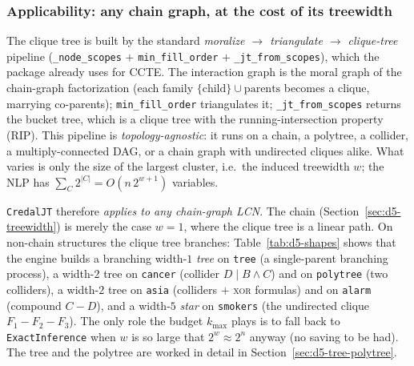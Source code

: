 \documentclass[11pt]{article}
\begin{document}
\subsubsection{Applicability: any chain graph, at the cost of its treewidth}

The clique tree is built by the standard \emph{moralize $\to$ triangulate $\to$ clique-tree}
pipeline (\texttt{\_node\_scopes} $+$ \texttt{min\_fill\_order} $+$ \texttt{\_jt\_from\_scopes}),
which the package already uses for CCTE. The interaction graph is the moral graph of the chain-graph
factorization (each family $\{\text{child}\}\cup\text{parents}$ becomes a clique, marrying
co-parents); \texttt{min\_fill\_order} triangulates it; \texttt{\_jt\_from\_scopes} returns the
bucket tree, which is a clique tree with the running-intersection property (RIP). This pipeline is
\emph{topology-agnostic}: it runs on a chain, a polytree, a collider, a multiply-connected DAG, or a
chain graph with undirected cliques alike. What varies is only the size of the largest cluster, i.e.\
the induced treewidth $w$; the NLP has $\sum_C 2^{|C|}=O(n\,2^{w+1})$ variables.

\texttt{CredalJT} therefore \emph{applies to any chain-graph LCN}. The chain
(Section~\ref{sec:d5-treewidth}) is merely the case $w{=}1$, where the clique tree is a linear path.
On non-chain structures the clique tree branches: Table~\ref{tab:d5-shapes} shows that the engine
builds a branching width-$1$ \emph{tree} on \texttt{tree} (a single-parent branching process), a
width-$2$ tree on \texttt{cancer} (collider $D\mid B\!\land\!C$) and on \texttt{polytree} (two
colliders), a width-$2$ tree on \texttt{asia} (colliders $+$ \textsc{xor} formulas) and on
\texttt{alarm} (compound $C\!-\!D$), and a width-$5$ \emph{star} on \texttt{smokers} (the undirected
clique $F_1\!-\!F_2\!-\!F_3$). The only role the budget $k_{\max}$ plays is to fall back to
\texttt{ExactInference} when $w$ is so large that $2^{w}\!\approx\!2^n$ anyway (no saving to be
had). The tree and the polytree are worked in detail in Section~\ref{sec:d5-tree-polytree}.
\end{document}
